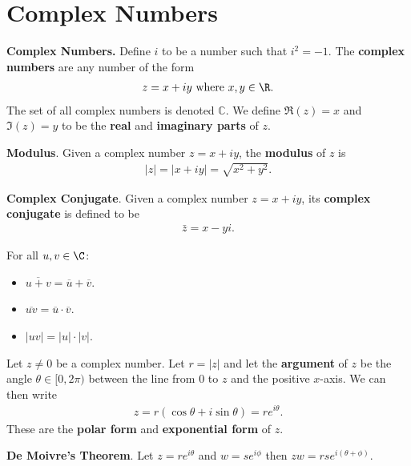 \documentclass{article}
\begin{document}
\section{Complex Numbers}
\begin{definition}
    \textbf{Complex Numbers.} Define $i$ to be a number such that $i^2 = -1$.
    The \textbf{complex numbers} are any number of the form
    \begin{align*}
        z = x+iy \text{ where } x,y\in\R.
    \end{align*}
    The set of all complex numbers is denoted $\mathbb{C}$. We define $\Re(z) = x$ and $\Im(z)=y$ to be the \textbf{real} and \textbf{imaginary parts} of $z$.
\end{definition}
\begin{definition}
    \textbf{Modulus}. Given a complex number $z=x+iy$, the \textbf{modulus} of $z$ is
    \begin{align*}
        |z|=|x+iy|=\sqrt{x^2+y^2}.
    \end{align*}
\end{definition}
\begin{definition}
    \textbf{Complex Conjugate}. Given a complex number $z=x+iy$, its \textbf{complex conjugate} is defined to be
    \begin{align*}
        \bar{z}=x-yi.
    \end{align*}
\end{definition}
\begin{theorem}
    For all $u,v\in\C$:
    \begin{itemize}
        \item $\overline{u+v}=\overline{u}+\overline{v}$.
        \item $\overline{uv}=\overline{u}\cdot\overline{v}$.
        \item $|uv|=|u|\cdot|v|$.
    \end{itemize}
\end{theorem}
\begin{definition}
    Let $z\not=0$ be a complex number.
    Let $r=|z|$ and let the \textbf{argument} of $z$ be the angle $\theta\in[0,2\pi)$ between the line from $0$ to $z$ and the positive $x$-axis. We can then write
    \begin{align*}
        z = r(\cos\theta+i\sin\theta)=re^{i\theta}.
    \end{align*}
    These are the \textbf{polar form} and \textbf{exponential form} of $z$.
\end{definition}
\begin{theorem}
    \textbf{De Moivre's Theorem}. Let $z=re^{i\theta}$ and $w=se^{i\phi}$ then $zw=rse^{i(\theta+\phi)}$.
\end{theorem}
\end{document}
